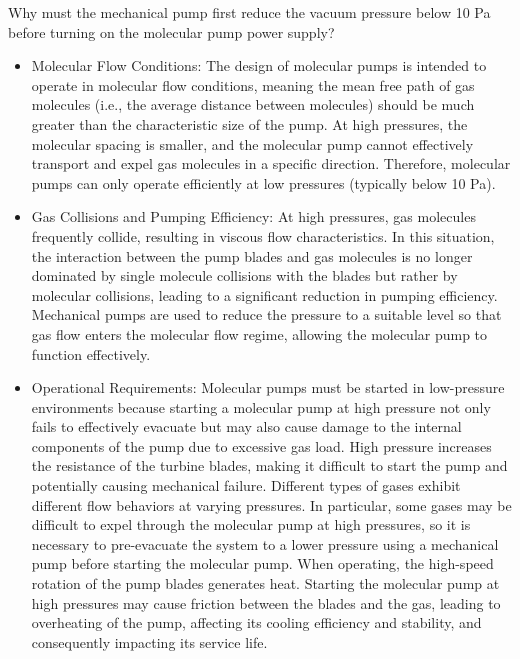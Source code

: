 \begin{question}
	Why must the mechanical pump first reduce the vacuum pressure below 10 Pa before turning on the molecular pump power supply?
\end{question}


\begin{itemize}
	\item Molecular Flow Conditions: The design of molecular pumps is intended to operate in molecular flow conditions, meaning the mean free path of gas molecules (i.e., the average distance between molecules) should be much greater than the characteristic size of the pump. At high pressures, the molecular spacing is smaller, and the molecular pump cannot effectively transport and expel gas molecules in a specific direction. Therefore, molecular pumps can only operate efficiently at low pressures (typically below 10 Pa).
	
	\item Gas Collisions and Pumping Efficiency: At high pressures, gas molecules frequently collide, resulting in viscous flow characteristics. In this situation, the interaction between the pump blades and gas molecules is no longer dominated by single molecule collisions with the blades but rather by molecular collisions, leading to a significant reduction in pumping efficiency. Mechanical pumps are used to reduce the pressure to a suitable level so that gas flow enters the molecular flow regime, allowing the molecular pump to function effectively.
	
	\item Operational Requirements: Molecular pumps must be started in low-pressure environments because starting a molecular pump at high pressure not only fails to effectively evacuate but may also cause damage to the internal components of the pump due to excessive gas load. High pressure increases the resistance of the turbine blades, making it difficult to start the pump and potentially causing mechanical failure. Different types of gases exhibit different flow behaviors at varying pressures. In particular, some gases may be difficult to expel through the molecular pump at high pressures, so it is necessary to pre-evacuate the system to a lower pressure using a mechanical pump before starting the molecular pump. When operating, the high-speed rotation of the pump blades generates heat. Starting the molecular pump at high pressures may cause friction between the blades and the gas, leading to overheating of the pump, affecting its cooling efficiency and stability, and consequently impacting its service life.
\end{itemize}

